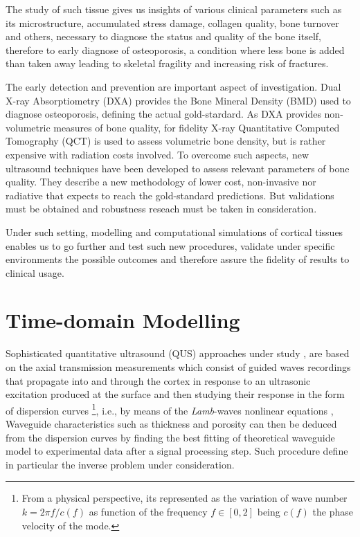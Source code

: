 The study of such tissue gives us insights of various clinical parameters such as its microstructure, accumulated stress damage, collagen quality, bone turnover and others, necessary to diagnose the status and quality of the bone itself, therefore to early diagnose of osteoporosis, a condition where less bone is added than taken away leading to skeletal fragility and increasing risk of fractures.

The early detection and prevention are important aspect of investigation. Dual X-ray Absorptiometry (DXA) provides the Bone Mineral Density (BMD) used to diagnose osteoporosis, defining the actual gold-stardard.
As DXA provides non-volumetric measures of bone quality, for fidelity X-ray Quantitative Computed Tomography (QCT) is used to assess volumetric bone density, but is rather expensive with radiation costs involved. To overcome such aspects, new ultrasound techniques have been developed to assess relevant parameters of bone quality. They describe a new methodology of lower cost, non-invasive nor radiative that expects to reach the gold-standard predictions. But validations must be obtained and robustness reseach must be taken in consideration.

Under such setting, modelling and computational simulations of cortical tissues enables us to go further and test such new  procedures, validate under specific environments the possible outcomes and therefore assure the fidelity of results to clinical usage.


\section{Time-domain Modelling}

Sophisticated quantitative ultrasound (QUS) approaches under study \cite{Foiret2014} \cite{Minonzio2018}, are based on the axial transmission measurements which consist of guided waves recordings that propagate into and through the cortex in response to an ultrasonic excitation produced at the surface and then studying their response in the form of dispersion curves \footnote{From a physical perspective, its represented as the variation of wave number $k = 2 \pi f/c(f)$ as function of the frequency $f \in [0, 2]$ being $c(f)$ the phase velocity of the mode.}, i.e., by means of the \textit{Lamb}-waves nonlinear equations \cite{Rhee2007},
Waveguide characteristics such as thickness and porosity can then be deduced from the dispersion curves by finding the best fitting of theoretical waveguide model to experimental data after a signal processing step. Such procedure define in particular the inverse problem under consideration.

